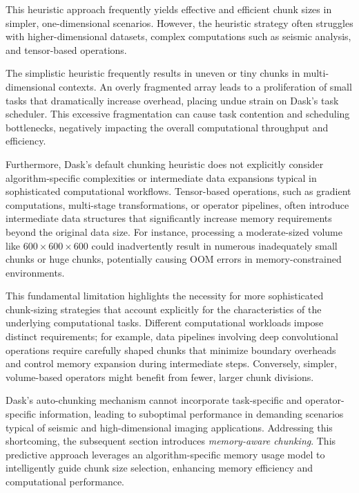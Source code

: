This heuristic approach frequently yields effective and efficient chunk sizes in simpler, one-dimensional scenarios.
However, the heuristic strategy often struggles with higher-dimensional datasets, complex computations such as seismic analysis, and tensor-based operations.

The simplistic heuristic frequently results in uneven or tiny chunks in multi-dimensional contexts.
An overly fragmented array leads to a proliferation of small tasks that dramatically increase overhead, placing undue strain on Dask's task scheduler.
This excessive fragmentation can cause task contention and scheduling bottlenecks, negatively impacting the overall computational throughput and efficiency.

Furthermore, Dask's default chunking heuristic does not explicitly consider algorithm-specific complexities or intermediate data expansions typical in sophisticated computational workflows.
Tensor-based operations, such as gradient computations, multi-stage transformations, or operator pipelines, often introduce intermediate data structures that significantly increase memory requirements beyond the original data size.
For instance, processing a moderate-sized volume like $600\times600\times600$ could inadvertently result in numerous inadequately small chunks or huge chunks, potentially causing \ac{OOM} errors in memory-constrained environments.

This fundamental limitation highlights the necessity for more sophisticated chunk-sizing strategies that account explicitly for the characteristics of the underlying computational tasks.
Different computational workloads impose distinct requirements; for example, data pipelines involving deep convolutional operations require carefully shaped chunks that minimize boundary overheads and control memory expansion during intermediate steps.
Conversely, simpler, volume-based operators might benefit from fewer, larger chunk divisions.

Dask's auto-chunking mechanism cannot incorporate task-specific and operator-specific information, leading to suboptimal performance in demanding scenarios typical of seismic and high-dimensional imaging applications.
Addressing this shortcoming, the subsequent section introduces \emph{memory-aware chunking}. This predictive approach leverages an algorithm-specific memory usage model to intelligently guide chunk size selection, enhancing memory efficiency and computational performance.